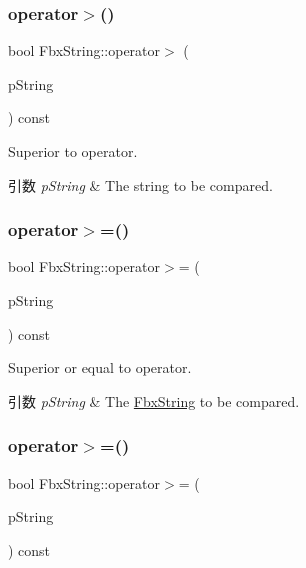 \subsubsection{\texorpdfstring{operator$>$()}{operator>()}\hspace{0.1cm}{\footnotesize\ttfamily [2/2]}}
{\footnotesize\ttfamily bool Fbx\+String\+::operator$>$ (\begin{DoxyParamCaption}\item[{const char $\ast$}]{p\+String }\end{DoxyParamCaption}) const}

Superior to operator. 
\begin{DoxyParams}{引数}
{\em p\+String} & The string to be compared. \\
\hline
\end{DoxyParams}
\mbox{\label{class_fbx_string_a8e6107be9189058c44856cc971152f65}} 
\subsubsection{\texorpdfstring{operator$>$=()}{operator>=()}\hspace{0.1cm}{\footnotesize\ttfamily [1/2]}}
{\footnotesize\ttfamily bool Fbx\+String\+::operator$>$= (\begin{DoxyParamCaption}\item[{const \hyperlink{class_fbx_string}{Fbx\+String} \&}]{p\+String }\end{DoxyParamCaption}) const}

Superior or equal to operator. 
\begin{DoxyParams}{引数}
{\em p\+String} & The \hyperlink{class_fbx_string}{Fbx\+String} to be compared. \\
\hline
\end{DoxyParams}
\mbox{\label{class_fbx_string_ace37c7b32e99f8c7099014058870d4d6}} 
\subsubsection{\texorpdfstring{operator$>$=()}{operator>=()}\hspace{0.1cm}{\footnotesize\ttfamily [2/2]}}
{\footnotesize\ttfamily bool Fbx\+String\+::operator$>$= (\begin{DoxyParamCaption}\item[{const char $\ast$}]{p\+String }\end{DoxyParamCaption}) const}

